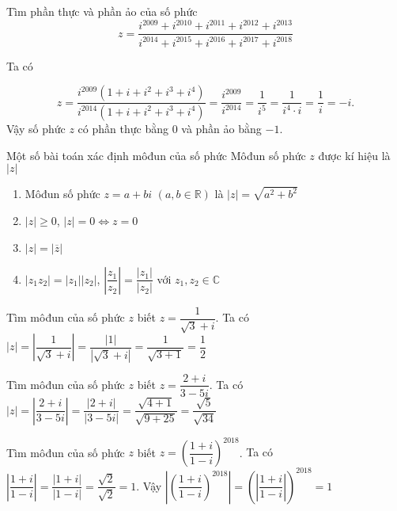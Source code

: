 \begin{bt}%
	Tìm phần thực và phần ảo của số phức
	\[z = \dfrac{i^{2009} + i^{2010} + i^{2011} + i^{2012} + i^{2013}}{i^{2014} + i^{2015} + i^{2016} + i^{2017} + i^{2018}}\]
	\loigiai
	{
		Ta có
		
		\[z = \dfrac{i^{2009} \left(1 + i + i^2 + i^3 + i^4\right)}{i^{2014} \left(1 + i + i^2 + i^3 + i^4\right)} = \dfrac{i^{2009}}{i^{2014}} = \dfrac{1}{i^5} = \dfrac{1}{i^4 \cdot i} = \dfrac{1}{i} = -i.\]
		Vậy số phức $z$ có phần thực bằng $0$ và phần ảo bằng $-1$.
	}
\end{bt}


\begin{dang}{Một số bài toán xác định môđun của số phức}
	Môđun số phức $z$ được kí hiệu là $\left|z \right|$
	\begin{enumerate}[\bfseries 1)]
		\item Môđun số phức $z=a+bi$ $\left(a,b\in \mathbb{R} \right) $ là $\left|z \right|=\sqrt{a^2+b^2} $ 
		\item $\left|z \right|\geq 0 $, $\left|z \right|=0\Leftrightarrow z=0$
		\item $\left|z \right| =\left|\overline{z} \right| $
		\item $\left|z_1z_2 \right|=\left|z_1 \right|\left|z_2 \right|$,  $\left|\dfrac{z_1}{z_2} \right| =\dfrac{\left|z_1 \right|}{\left|z_2 \right|}$ với $z_1,z_2\in \mathbb{C}$
	\end{enumerate}
\end{dang}
\begin{vd}%
	Tìm môđun của số phức $z$ biết $z=\dfrac{1}{\sqrt{3}+i}$.
	\loigiai
	{
		Ta có $\left|z \right|=\left|\dfrac{1}{\sqrt{3}+i} \right|=\dfrac{\left|1 \right|}{\left|\sqrt{3}+i \right|}=\dfrac{1}{\sqrt{3+1}}=\dfrac{1}{2}$
	}
\end{vd}

\begin{vd}%
	Tìm môđun của số phức $z$ biết $z=\dfrac{2+i}{3-5i}$.
	\loigiai 
	{
		Ta có $\left|z \right|=\left|\dfrac{2+i}{3-5i} \right|=\dfrac{\left|2+i \right|}{\left|3-5i \right|}=\dfrac{\sqrt{4+1}}{\sqrt{9+25}}=\dfrac{\sqrt{5}}{\sqrt{34}}$
	}
\end{vd}

\begin{vd}%
	Tìm môđun của số phức $z$ biết $z=\left(\dfrac{1+i}{1-i} \right)^{2018}$.
	\loigiai
	{
		Ta có $\left|\dfrac{1+i}{1-i} \right|=\dfrac{\left|1+i \right|}{\left|1-i \right|}=\dfrac{\sqrt{2}}{\sqrt{2}}=1$. Vậy $\left|\left(\dfrac{1+i}{1-i} \right)^{2018} \right|=\left(\left|\dfrac{1+i}{1-i} \right| \right)^{2018}=1$			
	}
\end{vd}

